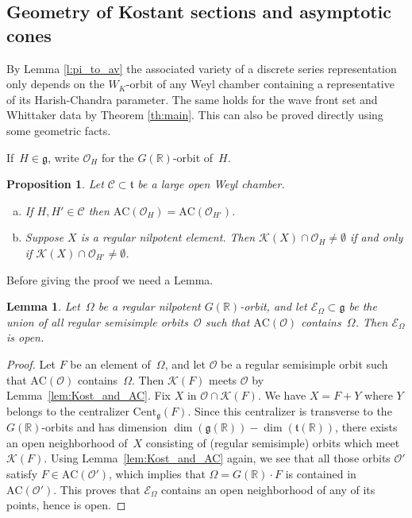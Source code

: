 \documentclass[cupthm]{CUP-JNL-JMJ}
\numberwithin{equation}{section}
\theoremstyle{cupplain}
\newtheorem{proposition}{Proposition}[section]
\newtheorem{lemma}[theorem]{Lemma}
\theoremstyle{cupdefinition}
\theoremstyle{cupremark}
\theoremstyle{cupproof}
\newtheorem{proof}{Proof}
\renewcommand{\O}{\mathcal O}
\newcommand{\R}{\mathbb R}
\newcommand{\K}{\mathcal K}
\renewcommand{\t}{\mathfrak t}
\newcommand{\g}{\mathfrak g}
\newcommand{\AC}{\mathrm{AC}}
\newcommand{\Kostant}[1]{\mathcal{K}(#1)}
\begin{document}
\subsection{Geometry of Kostant sections and asymptotic cones}

By Lemma \ref{l:pi_to_av} the associated variety of a discrete series representation only depends on the $W_K$-orbit of any Weyl chamber containing a representative of its Harish-Chandra parameter. 
The same holds for the wave front set and Whittaker data by Theorem \ref{th:main}. This can also be proved directly 
using some geometric facts. 

If~$H \in \g$, write $\O_H$ for the $G(\R)$-orbit of~$H$.

\begin{proposition}\label{prop:AC_chamber} Let $\mathcal{C} \subset \t$ be a large open Weyl chamber.
\begin{enumerate}[(a)]
\item  If $H,H'\in\mathcal{C}$  then $\AC(\mathcal{O}_H)=\AC(\mathcal{O}_{H'})$.

\item  Suppose $X$ is a regular nilpotent element. Then $\K(X)\cap \O_H\ne \emptyset$ if and only if $\K(X)\cap \O_{H'}\ne\emptyset$.
\end{enumerate}
\end{proposition}

Before giving the proof we need a Lemma.

\begin{lemma}\label{lem:AC_containment} Let~$\Omega$ be a regular nilpotent $G(\R)$-orbit, and let $\mathcal{E}_\Omega \subset \g$ be the union of all regular semisimple orbits~$\mathcal{O}$ such that $\AC(\mathcal{O})$ contains~$\Omega$. Then $\mathcal{E}_\Omega$ is open. 
\end{lemma}

\begin{proof}

Let $F$ be an element of~$\Omega$, and let $\mathcal{O}$  be a regular semisimple orbit such that $\AC(\mathcal{O})$ contains~$\Omega$.
Then $\Kostant{F}$ meets $\mathcal{O}$ by  Lemma~\ref{lem:Kost_and_AC}. 
Fix $X$ in $\mathcal{O} \cap \Kostant{F}$.
We have $X =F+Y$ where $Y$ belongs to the centralizer $\mathrm{Cent}_\g(F)$.
Since this centralizer is transverse to the $G(\R)$-orbits and has dimension $\dim(\g(\R))-\dim(\t(\R))$,
there exists an open neighborhood of~$X$ consisting of (regular semisimple) orbits  which meet $\Kostant{F}$.
Using Lemma~\ref{lem:Kost_and_AC} again, we see that all those orbits $\mathcal{O}'$ satisfy $F \in \AC(\mathcal{O}')$,
which implies that $\Omega = G(\R) \cdot F$ is contained in $\AC(\mathcal{O}')$.
This proves that $\mathcal{E}_\Omega$ contains an open neighborhood of any of its points, hence is open.   \end{proof}
\end{document}
